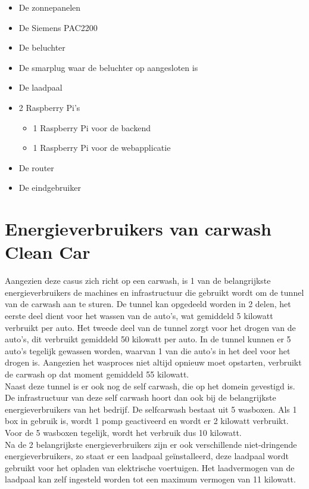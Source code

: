 \begin{itemize}
    \item De zonnepanelen
    \item De Siemens PAC2200
    \item De beluchter
    \item De smarplug waar de beluchter op aangesloten is
    \item De laadpaal
    \item 2 Raspberry Pi’s
    \begin{itemize}
        \item 1 Raspberry Pi voor de backend
        \item 1 Raspberry Pi voor de webapplicatie
    \end{itemize}
    \item De router
    \item De eindgebruiker
\end{itemize}

\section{Energieverbruikers van carwash Clean Car}
\label{sec:stand-van-zaken-energieverbruikers}

Aangezien deze casus zich richt op een carwash, is 1 van de belangrijkste energieverbruikers de machines en infrastructuur die gebruikt wordt om de tunnel van de carwash aan te sturen. De tunnel kan opgedeeld worden in 2 delen, het eerste deel dient voor het wassen van de auto’s, wat gemiddeld 5 kilowatt verbruikt per auto. Het tweede deel van de tunnel zorgt voor het drogen van de auto’s, dit verbruikt gemiddeld 50 kilowatt per auto. In de tunnel kunnen er 5 auto’s tegelijk gewassen worden, waarvan 1 van die auto’s in het deel voor het drogen is. Aangezien het wasproces niet altijd opnieuw moet opstarten, verbruikt de carwash op dat moment gemiddeld 55 kilowatt.\\

Naast deze tunnel is er ook nog de self carwash, die op het domein gevestigd is. De infrastructuur van deze self carwash hoort dan ook bij de belangrijkste energieverbruikers van het bedrijf. De selfcarwash bestaat uit 5 wasboxen. Als 1 box in gebruik is, wordt 1 pomp geactiveerd en wordt er 2 kilowatt verbruikt. Voor de 5 wasboxen tegelijk, wordt het verbruik dus 10 kilowatt.\\

Na de 2 belangrijkste energieverbruikers zijn er ook verschillende niet-dringende energieverbruikers, zo staat er een laadpaal geïnstalleerd, deze laadpaal wordt gebruikt voor het opladen van elektrische voertuigen. Het laadvermogen van de laadpaal kan zelf ingesteld worden tot een maximum vermogen van 11 kilowatt.\\

